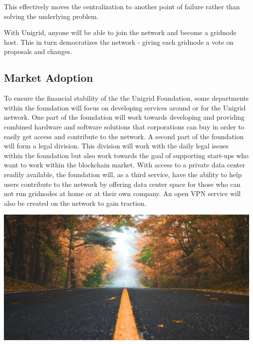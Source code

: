 \documentclass[a4paper,oneside]{article}
\begin{document}
\noindent This effectively moves the centralization to another point of failure rather than solving the underlying problem.

With Unigrid, anyone will be able to join the network and become a gridnode host. This in turn democratizes the network - giving each gridnode a vote on proposals and changes.

\subsection{Market Adoption}
To ensure the financial stability of the the Unigrid Foundation, some departments within the foundation will focus on developing services around or for the Unigrid network. One part of the foundation will work towards developing and providing combined hardware and software solutions that corporations can buy in order to easily get access and contribute to the network. A second part of the foundation will form a legal division. This division will work with the daily legal issues within the foundation but also work towards the goal of supporting start-ups who want to work within the blockchain market. With access to a private data center readily available, the foundation will, as a third service, have the ability to help users contribute to the network by offering data center space for those who can not run gridnodes at home or at their own company. An open VPN service will also be created on the network to gain traction. 

\vspace{0.12cm}
\begin{mdframed}[style=textimage]
	\includegraphics[width=381pt]{road}
\end{mdframed}
\end{document}
